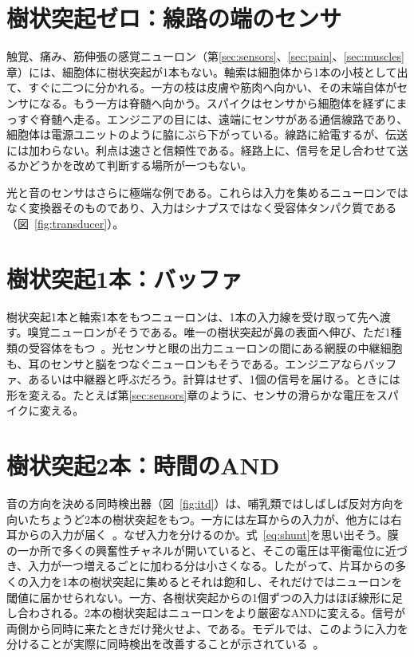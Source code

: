 \section{樹状突起ゼロ：線路の端のセンサ}

触覚、痛み、筋伸張の感覚ニューロン（第\ref{sec:sensors}、\ref{sec:pain}、\ref{sec:muscles}章）には、細胞体に樹状突起が1本もない。軸索は細胞体から1本の小枝として出て、すぐに二つに分かれる。一方の枝は皮膚や筋肉へ向かい、その末端自体がセンサになる。もう一方は脊髄へ向かう。スパイクはセンサから細胞体を経ずにまっすぐ脊髄へ走る。エンジニアの目には、遠端にセンサがある通信線路であり、細胞体は電源ユニットのように脇にぶら下がっている。線路に給電するが、伝送には加わらない。利点は速さと信頼性である。経路上に、信号を足し合わせて送るかどうかを改めて判断する場所が一つもない。

光と音のセンサはさらに極端な例である。これらは入力を集めるニューロンではなく変換器そのものであり、入力はシナプスではなく受容体タンパク質である（図~\ref{fig:transducer}）。

\section{樹状突起1本：バッファ}

樹状突起1本と軸索1本をもつニューロンは、1本の入力線を受け取って先へ渡す。嗅覚ニューロンがそうである。唯一の樹状突起が鼻の表面へ伸び、ただ1種類の受容体をもつ~\cite{Mombaerts2004}。光センサと眼の出力ニューロンの間にある網膜の中継細胞も、耳のセンサと脳をつなぐニューロンもそうである。エンジニアならバッファ、あるいは中継器と呼ぶだろう。計算はせず、1個の信号を届ける。ときには形を変える。たとえば第\ref{sec:sensors}章のように、センサの滑らかな電圧をスパイクに変える。

\section{樹状突起2本：時間のAND}

音の方向を決める同時検出器（図~\ref{fig:itd}）は、哺乳類ではしばしば反対方向を向いたちょうど2本の樹状突起をもつ。一方には左耳からの入力が、他方には右耳からの入力が届く~\cite{Grothe2010}。なぜ入力を分けるのか。式~\eqref{eq:shunt}を思い出そう。膜の一か所で多くの興奮性チャネルが開いていると、そこの電圧は平衡電位に近づき、入力が一つ増えるごとに加わる分は小さくなる。したがって、片耳からの多くの入力を1本の樹状突起に集めるとそれは飽和し、それだけではニューロンを閾値に届かせられない。一方、各樹状突起からの1個ずつの入力はほぼ線形に足し合わされる。2本の樹状突起はニューロンをより厳密なANDに変える。信号が両側から同時に来たときだけ発火せよ、である。モデルでは、このように入力を分けることが実際に同時検出を改善することが示されている~\cite{AgmonSnir1998}。

